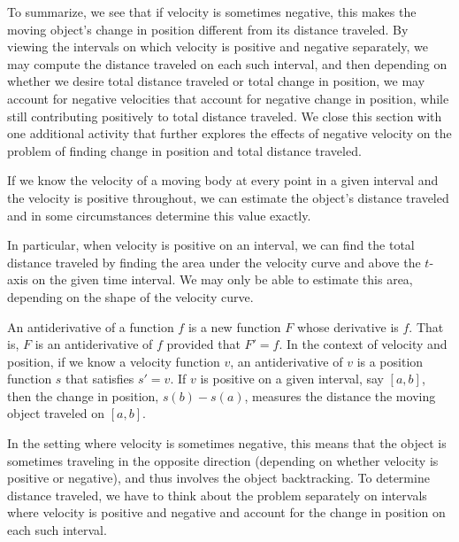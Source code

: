 To summarize, we see that if velocity is sometimes negative, this makes the moving object's change in position different from its distance traveled.  By viewing the intervals on which velocity is positive and negative separately, we may compute the distance traveled on each such interval, and then depending on whether we desire total distance traveled or total change in position, we may account for negative velocities that account for negative change in position, while still contributing positively to total distance traveled.  We close this section with one additional activity that further explores the effects of negative velocity on the problem of finding change in position and total distance traveled.




\begin{summary}
\item If we know the velocity of a moving body at every point in a given interval and the velocity is positive throughout, we can estimate the object's distance traveled and in some circumstances determine this value exactly.
\item In particular, when velocity is positive on an interval, we can find the total distance traveled by finding the area under the velocity curve and above the $t$-axis on the given time interval.  We may only be able to estimate this area, depending on the shape of the velocity curve.
\item An antiderivative of a function $f$ is a new function $F$ whose derivative is $f$.  That is, $F$ is an antiderivative of $f$ provided that $F' = f$.  In the context of velocity and position, if we know a velocity function $v$, an antiderivative of $v$ is a position function $s$ that satisfies $s' = v$.  If $v$ is positive on a given interval, say $[a,b]$, then the change in position, $s(b) - s(a)$, measures the distance the moving object traveled on $[a,b]$.
\item In the setting where velocity is sometimes negative, this means that the object is sometimes traveling in the opposite direction (depending on whether velocity is positive or negative), and thus involves the object backtracking.  To determine distance traveled, we have to think about the problem separately on intervals where velocity is positive and negative and account for the change in position on each such interval.
\end{summary}

\nin \hrulefill

\newpage

 

\clearpage
